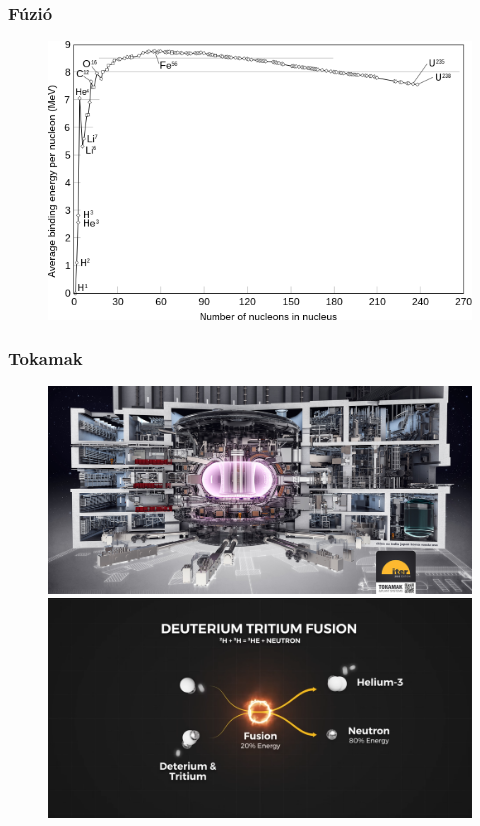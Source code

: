 \documentclass{beamer}
\begin{document}
\begin{frame}
    \frametitle{Fúzió}
    \begin{figure}
        \includegraphics[scale=0.5]{Binding_energy_curve_-_common_isotopes.svg.png}
    \end{figure} 
\end{frame}
\begin{frame}
    \frametitle{Tokamak}
    \begin{figure}
        \includegraphics[scale=0.045]{iter.jpeg}
        \includegraphics[scale=0.14]{deut_trit_v2.png}
    \end{figure} 
\end{frame}
\end{document}
